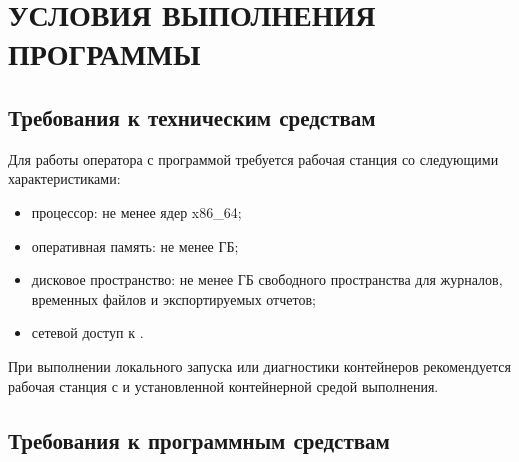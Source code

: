 \documentclass[12pt,a4paper]{extarticle}
\begin{document}
\section{УСЛОВИЯ ВЫПОЛНЕНИЯ ПРОГРАММЫ}

\subsection{Требования к техническим средствам}

\begin{hseExample}
Для работы оператора с программой требуется рабочая станция со следующими характеристиками:

\begin{itemize}[leftmargin=1.25cm]
    \item процессор: не менее  ядер x86\_64;
    \item оперативная память: не менее  ГБ;
    \item дисковое пространство: не менее  ГБ свободного пространства для журналов, временных файлов и экспортируемых отчетов;
    \item сетевой доступ к .
\end{itemize}

При выполнении локального запуска или диагностики контейнеров рекомендуется рабочая станция с  и установленной контейнерной средой выполнения.
\end{hseExample}

\subsection{Требования к программным средствам}
\end{document}

